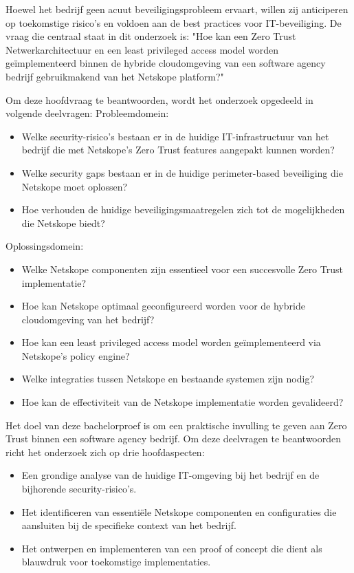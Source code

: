 Hoewel het bedrijf geen acuut beveiligingsprobleem ervaart, willen zij anticiperen op toekomstige risico's en voldoen aan de best practices voor IT-beveiliging.
De vraag die centraal staat in dit onderzoek is: "Hoe kan een Zero Trust Netwerkarchitectuur en een least privileged access model worden geïmplementeerd binnen de hybride cloudomgeving van een software agency bedrijf gebruikmakend van het Netskope platform?"

Om deze hoofdvraag te beantwoorden, wordt het onderzoek opgedeeld in volgende deelvragen:
Probleemdomein:
\begin{itemize}
  \item Welke security-risico's bestaan er in de huidige IT-infrastructuur van het bedrijf die met Netskope's Zero Trust features aangepakt kunnen worden?
  \item Welke security gaps bestaan er in de huidige perimeter-based beveiliging die Netskope moet oplossen?
  \item Hoe verhouden de huidige beveiligingsmaatregelen zich tot de mogelijkheden die Netskope biedt?
\end{itemize}

Oplossingsdomein:
\begin{itemize}
  \item Welke Netskope componenten zijn essentieel voor een succesvolle Zero Trust implementatie?
  \item Hoe kan Netskope optimaal geconfigureerd worden voor de hybride cloudomgeving van het bedrijf?
  \item Hoe kan een least privileged access model worden geïmplementeerd via Netskope's policy engine?
  \item Welke integraties tussen Netskope en bestaande systemen zijn nodig?
  \item Hoe kan de effectiviteit van de Netskope implementatie worden gevalideerd?
\end{itemize}

Het doel van deze bachelorproef is om een praktische invulling te geven aan Zero Trust binnen een software agency bedrijf. Om deze deelvragen te beantwoorden richt het onderzoek zich op drie hoofdaspecten:
\begin{itemize}
  \item Een grondige analyse van de huidige IT-omgeving bij het bedrijf en de bijhorende security-risico's.
  \item Het identificeren van essentiële Netskope componenten en configuraties die aansluiten bij de specifieke context van het bedrijf.
  \item Het ontwerpen en implementeren van een proof of concept die dient als blauwdruk voor toekomstige implementaties.
\end{itemize}

